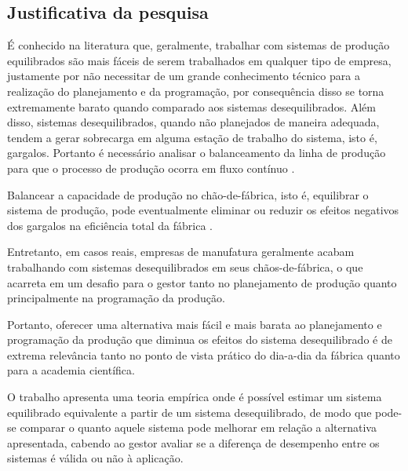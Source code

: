 \subsection{Justificativa da pesquisa} \label{subsec:justif}

É conhecido na literatura que, geralmente, trabalhar com sistemas de produção equilibrados são mais fáceis de serem trabalhados em qualquer tipo de empresa, justamente por não necessitar de um grande conhecimento técnico para a realização do planejamento e da programação, por consequência disso se torna extremamente barato quando comparado aos sistemas desequilibrados. Além disso, sistemas desequilibrados, quando não planejados de maneira adequada, tendem a gerar sobrecarga em alguma estação de trabalho do sistema, isto é, gargalos. Portanto é necessário analisar o balanceamento da linha de produção para que o processo de produção ocorra em fluxo contínuo \cite{Syahputri2018}.

Balancear a capacidade de produção no chão-de-fábrica, isto é, equilibrar o sistema de produção, pode eventualmente eliminar ou reduzir os efeitos negativos dos gargalos na eficiência total da fábrica \cite{Varela2017}.

Entretanto, em casos reais, empresas de manufatura geralmente acabam trabalhando com sistemas desequilibrados em seus chãos-de-fábrica, o que acarreta em um desafio para o gestor tanto no planejamento de produção quanto principalmente na programação da produção.

Portanto, oferecer uma alternativa mais fácil e mais barata ao planejamento e programação da produção que diminua os efeitos do sistema desequilibrado é de extrema relevância tanto no ponto de vista prático do dia-a-dia da fábrica quanto para a academia científica. 

O trabalho apresenta uma teoria empírica onde é possível estimar um sistema equilibrado equivalente a partir de um sistema desequilibrado, de modo que pode-se comparar o quanto aquele sistema pode melhorar em relação a alternativa apresentada, cabendo ao gestor avaliar se a diferença de desempenho entre os sistemas é válida ou não à aplicação.